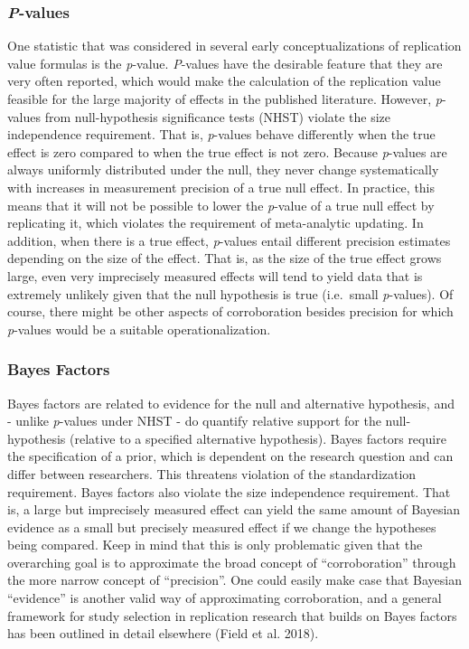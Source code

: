 \documentclass[]{article}
\begin{document}
\hypertarget{p-values}{%
\subsubsection{\texorpdfstring{\emph{P}-values}{P-values}}\label{p-values}}

One statistic that was considered in several early conceptualizations of
replication value formulas is the \emph{p}-value. \emph{P}-values have
the desirable feature that they are very often reported, which would
make the calculation of the replication value feasible for the large
majority of effects in the published literature. However,
\emph{p}-values from null-hypothesis significance tests (NHST) violate
the size independence requirement. That is, \emph{p}-values behave
differently when the true effect is zero compared to when the true
effect is not zero. Because \emph{p}-values are always uniformly
distributed under the null, they never change systematically with
increases in measurement precision of a true null effect. In practice,
this means that it will not be possible to lower the \emph{p}-value of a
true null effect by replicating it, which violates the requirement of
meta-analytic updating. In addition, when there is a true effect,
\emph{p}-values entail different precision estimates depending on the
size of the effect. That is, as the size of the true effect grows large,
even very imprecisely measured effects will tend to yield data that is
extremely unlikely given that the null hypothesis is true (i.e.~small
\emph{p}-values). Of course, there might be other aspects of
corroboration besides precision for which \emph{p}-values would be a
suitable operationalization.

\hypertarget{bayes-factors}{%
\subsubsection{Bayes Factors}\label{bayes-factors}}

Bayes factors are related to evidence for the null and alternative
hypothesis, and - unlike \emph{p}-values under NHST - do quantify
relative support for the null-hypothesis (relative to a specified
alternative hypothesis). Bayes factors require the specification of a
prior, which is dependent on the research question and can differ
between researchers. This threatens violation of the standardization
requirement. Bayes factors also violate the size independence
requirement. That is, a large but imprecisely measured effect can yield
the same amount of Bayesian evidence as a small but precisely measured
effect if we change the hypotheses being compared. Keep in mind that
this is only problematic given that the overarching goal is to
approximate the broad concept of ``corroboration'' through the more
narrow concept of ``precision''. One could easily make case that
Bayesian ``evidence'' is another valid way of approximating
corroboration, and a general framework for study selection in
replication research that builds on Bayes factors has been outlined in
detail elsewhere (Field et al. 2018).
\end{document}
